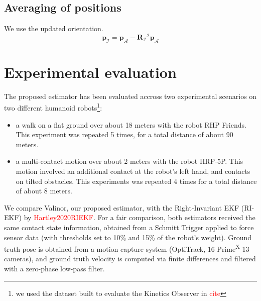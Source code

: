 \documentclass{IJCAS}
\begin{document}

            
\subsection{Averaging of positions}
We use the updated orientation.
\begin{equation}
    \boldsymbol{p}_{\mathcal{I}} = \boldsymbol{p}_{\mathcal{A}} - \boldsymbol{R}_{\mathcal{I}} {}^{\mathcal{I}}\boldsymbol{p}_{\mathcal{A}} 
\end{equation}

\section{Experimental evaluation}

The proposed estimator has been evaluated accross two experimental scenarios on two different humanoid robots\footnote{we used the dataset built to evaluate the Kinetics Observer in \textcolor{red}{cite}}:
\begin{itemize}
    \item a walk on a flat ground over about 18 meters with the robot RHP Friends. This experiment was repeated 5 times, for a total distance of about 90 meters. 
    \item a multi-contact motion over about 2 meters with the robot HRP-5P. This motion involved an additional contact at the robot's left hand, and contacts on tilted obstacles. This experiments was repeated 4 times for a total distance of about 8 meters.
\end{itemize}

We compare Valinor, our proposed estimator, with the Right-Invariant EKF (RI-EKF) by \textcolor{red}{Hartley2020RIEKF}. For a fair comparison, both estimators received the same contact state information, obtained from a Schmitt Trigger applied to force sensor data (with thresholds set to 10\% and 15\% of the robot's weight).
Ground truth pose is obtained from a motion capture system (OptiTrack, 16 Prime\textsuperscript{X} 13 cameras), and ground truth velocity is computed via finite differences and filtered with a zero-phase low-pass filter.
\end{document}
